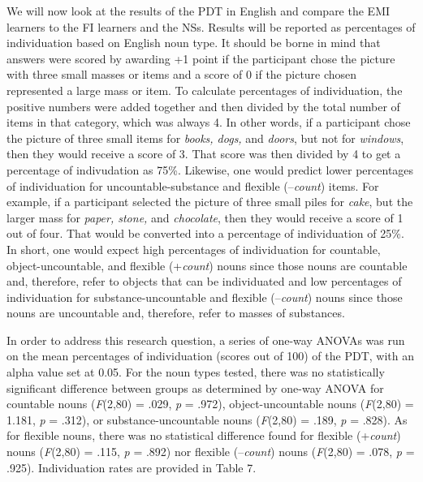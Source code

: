 \documentclass[12pt]{article}
\newenvironment{styleStandard}{\setlength\leftskip{0cm}\setlength\rightskip{0cm plus 1fil}\setlength\parindent{0cm}\setlength\parfillskip{0pt plus 1fil}\setlength\parskip{0in plus 1pt}\writerlistparindent\writerlistleftskip\leavevmode\normalfont\normalsize\writerlistlabel\ignorespaces}{\unskip\vspace{0.111in plus 0.0111in}\par}
\newcommand\writerlistleftskip{}
\newcommand\writerlistparindent{}
\newcommand\writerlistlabel{}
\begin{document}
\begin{styleStandard}
We will now look at the results of the PDT in English and compare the EMI learners to the FI learners and the NSs. Results will be reported as percentages of individuation based on English noun type. It should be borne in mind that answers were scored by awarding +1 point if the participant chose the picture with three small masses or items and a score of 0 if the picture chosen represented a large mass or item. To calculate percentages of individuation, the positive numbers were added together and then divided by the total number of items in that category, which was always 4. In other words, if a participant chose the picture of three small items for \textit{books, dogs, }and \textit{doors}, but not for \textit{windows}, then they would receive a score of 3. That score was then divided by 4 to get a percentage of indivudation as 75\%. Likewise, one would predict lower percentages of individuation for uncountable-substance and flexible (–\textit{count}) items. For example, if a participant selected the picture of three small piles for \textit{cake}, but the larger mass for \textit{paper, stone, }and \textit{chocolate}, then they would receive a score of 1 out of four. That would be converted into a percentage of individuation of 25\%. In short, one would expect high percentages of individuation for countable, object-uncountable, and flexible (+\textit{count}) nouns since those nouns are countable and, therefore, refer to objects that can be individuated and low percentages of individuation for substance-uncountable and flexible (–\textit{count}) nouns since those nouns are uncountable and, therefore, refer to masses of substances. 
\end{styleStandard}

\begin{styleStandard}
In order to address this research question, a series of one-way ANOVAs was run on the mean percentages of individuation (scores out of 100) of the PDT, with an alpha value set at 0.05. For the noun types tested, there was no statistically significant difference between groups as determined by one-way ANOVA for countable nouns (\textit{F}(2,80) = .029, \textit{p} = .972), object-uncountable nouns (\textit{F}(2,80) = 1.181, \textit{p} = .312), or substance-uncountable nouns (\textit{F}(2,80) = .189, \textit{p} = .828). As for flexible nouns, there was no statistical difference found for flexible (+\textit{count}) nouns (\textit{F}(2,80) = .115, \textit{p} = .892) nor flexible (–\textit{count}) nouns (\textit{F}(2,80) = .078, \textit{p} = .925). Individuation rates are provided in Table 7.
\end{styleStandard}
\end{document}
